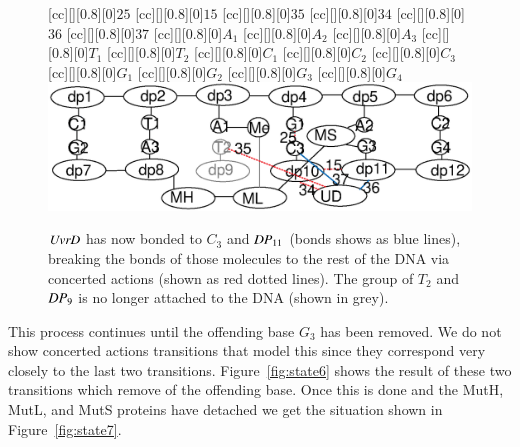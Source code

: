 \begin{figure}[h!]
[cc][][0.8][0]{$25$}
[cc][][0.8][0]{$15$}
[cc][][0.8][0]{$35$}
[cc][][0.8][0]{$34$}
[cc][][0.8][0]{$36$}
[cc][][0.8][0]{$37$}
[cc][][0.8][0]{${A_1}$}
[cc][][0.8][0]{${A_2}$}
[cc][][0.8][0]{${A_3}$}
[cc][][0.8][0]{${T_1}$}
[cc][][0.8][0]{\color{gray}${T_2}$}
[cc][][0.8][0]{${C_1}$}
[cc][][0.8][0]{${C_2}$}
[cc][][0.8][0]{${C_3}$}
[cc][][0.8][0]{${G_1}$}
[cc][][0.8][0]{${G_2}$}
[cc][][0.8][0]{${G_3}$}
[cc][][0.8][0]{${G_4}$}
  \centering
    \includegraphics[width=1.0\textwidth]{mmr/state4}
  \caption[A six base pair DNA fragment.]{%
  $\mathit{UvrD}$ has now bonded to $C_3$ and $\mathit{DP}_{11}$ (bonds shows as blue lines), breaking the bonds of those molecules to the rest of the DNA via concerted actions (shown as red dotted lines). The group of $T_2$ and $\mathit{DP}_{9}$ is no longer attached to the DNA (shown in grey). %
}
  \label{fig:state4}
\end{figure}

This process continues until the offending base $G_3$ has been removed. We do not show concerted actions transitions that model this since they correspond very closely to the last two transitions. Figure~\ref{fig:state6} shows the result of these two transitions which remove of the offending base.
Once this is done and the MutH, MutL, and MutS proteins have detached we get the situation shown in Figure~\ref{fig:state7}.


